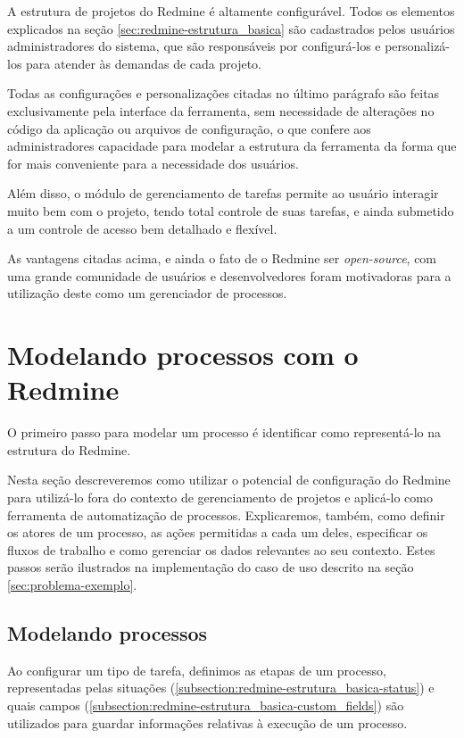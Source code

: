 A estrutura de projetos do Redmine é altamente configurável. Todos os elementos explicados na seção \ref{sec:redmine-estrutura_basica} são cadastrados pelos usuários administradores do sistema, que são responsáveis por configurá-los e personalizá-los para atender às demandas de cada projeto.

Todas as configurações e personalizações citadas no último parágrafo são feitas exclusivamente pela interface da ferramenta, sem necessidade de alterações no código da aplicação ou arquivos de configuração, o que confere aos administradores capacidade para modelar a estrutura da ferramenta da forma que for mais conveniente para a necessidade dos usuários.

Além disso, o módulo de gerenciamento de tarefas permite ao usuário interagir muito bem com o projeto, tendo total controle de suas tarefas, e ainda submetido a um controle de acesso bem detalhado e flexível.

As vantagens citadas acima, e ainda o fato de o Redmine ser \textit{open-source}, com uma grande comunidade de usuários e desenvolvedores foram motivadoras para a utilização deste como um gerenciador de processos.

\section{Modelando processos com o Redmine}\label{sec:redmine-automatizar_processo}

O primeiro passo para modelar um processo é identificar como representá-lo na estrutura do Redmine.

Nesta seção descreveremos como utilizar o potencial de configuração do Redmine para utilizá-lo fora do contexto de gerenciamento de projetos e aplicá-lo como ferramenta de automatização de processos. Explicaremos, também, como definir os atores de um processo, as ações permitidas a cada um deles, especificar os fluxos de trabalho e como gerenciar os dados relevantes ao seu contexto. Estes passos serão ilustrados na implementação do caso de uso descrito na seção \ref{sec:problema-exemplo}.


\subsection{Modelando processos}\label{subsection:redmine-automatizar_processo-criacao}

Ao configurar um tipo de tarefa, definimos as etapas de um processo, representadas pelas situações (\ref{subsection:redmine-estrutura_basica-status}) e quais campos (\ref{subsection:redmine-estrutura_basica-custom_fields}) são utilizados para guardar informações relativas à execução de um processo.

